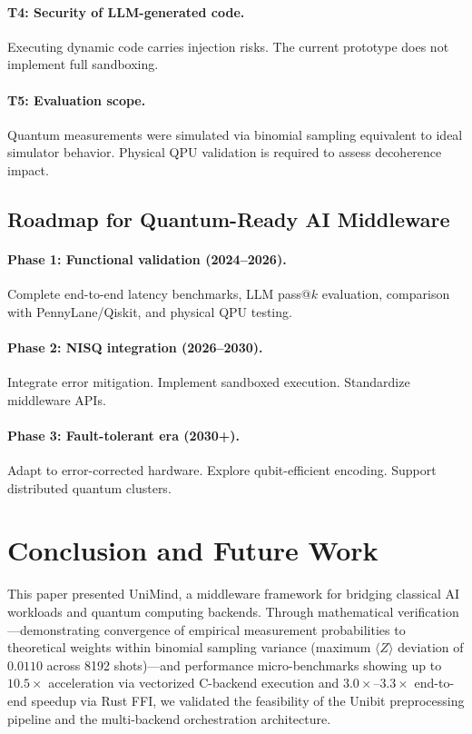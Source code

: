 ﻿\documentclass[12pt,a4paper]{article}
\begin{document}
\paragraph{T4: Security of LLM-generated code.} Executing dynamic code carries injection risks. The current prototype does not implement full sandboxing.

\paragraph{T5: Evaluation scope.} Quantum measurements were simulated via binomial sampling equivalent to ideal simulator behavior. Physical QPU validation is required to assess decoherence impact.

\subsection{Roadmap for Quantum-Ready AI Middleware}\label{sec:roadmap}

\paragraph{Phase 1: Functional validation (2024--2026).} Complete end-to-end latency benchmarks, LLM pass@$k$ evaluation, comparison with PennyLane/Qiskit, and physical QPU testing.

\paragraph{Phase 2: NISQ integration (2026--2030).} Integrate error mitigation. Implement sandboxed execution. Standardize middleware APIs.

\paragraph{Phase 3: Fault-tolerant era (2030+).} Adapt to error-corrected hardware. Explore qubit-efficient encoding. Support distributed quantum clusters.


\section{Conclusion and Future Work}\label{sec:conclusion}

This paper presented UniMind, a middleware framework for bridging classical AI workloads and quantum computing backends. Through mathematical verification---demonstrating convergence of empirical measurement probabilities to theoretical weights within binomial sampling variance (maximum $\langle Z \rangle$ deviation of $0.0110$ across 8192 shots)---and performance micro-benchmarks showing up to $10.5\times$ acceleration via vectorized C-backend execution and $3.0\times$--$3.3\times$ end-to-end speedup via Rust FFI, we validated the feasibility of the Unibit preprocessing pipeline and the multi-backend orchestration architecture.
\end{document}
